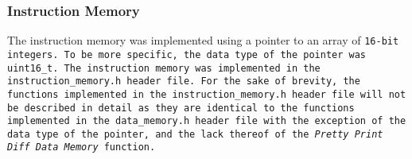 \documentclass[a4paper,12pt]{article}
\begin{document}
		\subsubsection{Instruction Memory}
			\par{
				The instruction memory was implemented using a pointer to an array of
				\tt{16-bit} integers. To be more specific, the data type of the pointer
				was \tt{uint16\_t}. The instruction memory was implemented in the
				\tt{instruction\_memory.h} header file. For the sake of brevity, the
				functions implemented in the \tt{instruction\_memory.h} header file
				will not be described in detail as they are identical to the functions
				implemented in the \tt{data\_memory.h} header file with the exception
				of the data type of the pointer, and the lack thereof of the
				\emph{Pretty Print Diff Data Memory} function.
			}
	
		\newpage
\end{document}
